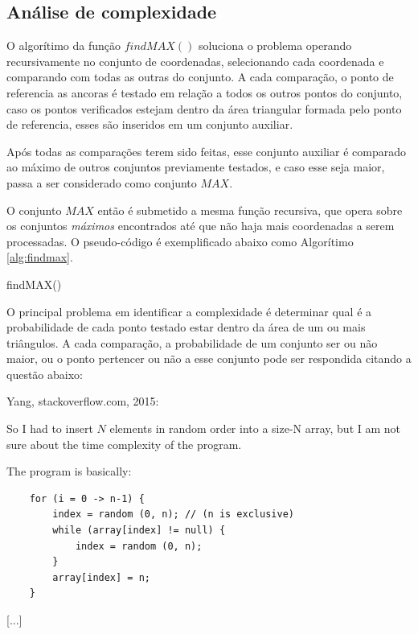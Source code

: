 \documentclass[12pt,a4paper]{article}
\begin{document}
\subsection{Análise de complexidade}

O algorítimo da função $findMAX()$ soluciona o problema operando recursivamente no conjunto de coordenadas, selecionando cada coordenada e comparando com todas as outras do conjunto. A cada comparação, o ponto de referencia as ancoras é testado em relação a todos os outros pontos do conjunto, caso os pontos verificados estejam dentro da área triangular formada pelo ponto de referencia, esses são inseridos em um conjunto auxiliar. 

Após todas as comparações terem sido feitas, esse conjunto auxiliar é comparado ao máximo de outros conjuntos previamente testados, e caso esse seja maior, passa a ser considerado como conjunto $MAX$.

O conjunto $MAX$ então é submetido a mesma função recursiva, que opera sobre os conjuntos \emph{máximos} encontrados até que não haja mais coordenadas a serem processadas. O pseudo-código é exemplificado abaixo como Algorítimo \ref{alg:findmax}.

\vspace{10pt}
\begin{algorithm}[H]
	\caption{findMAX()}
	\label{alg:findmax}
	\SetAlgoLined
\end{algorithm}
\vspace{10pt}

O principal problema em identificar a complexidade é determinar qual é a probabilidade de cada ponto testado estar dentro da área de um ou mais triângulos. A cada comparação, a probabilidade de um conjunto ser ou não maior, ou o ponto pertencer ou não a esse conjunto pode ser respondida citando a questão abaixo:

Yang, stackoverflow.com, 2015: 

\begin{quoting}[rightmargin=0cm,leftmargin=4cm]
	\begin{singlespace}
	{\footnotesize  
	So I had to insert $N$ elements in random order into a size-N array, but I am not sure about the time complexity of the program.

	The program is basically:\\

	\begin{BVerbatim}
	for (i = 0 -> n-1) {
		index = random (0, n); // (n is exclusive)
		while (array[index] != null) {
			index = random (0, n);
		}
		array[index] = n;
	}
	\end{BVerbatim}

	}
	\end{singlespace}
	[...]
\end{quoting}
\end{document}
